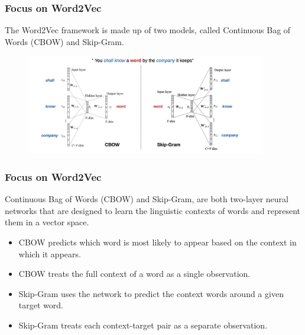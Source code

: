 \documentclass[
    11pt, %
    aspectratio=169, %
]{beamer}
\begin{document}
\begin{frame}
    \frametitle{Focus on Word2Vec}

    The Word2Vec framework is made up of two models, called Continuous Bag of Words (CBOW) and Skip-Gram.

    \begin{figure}
        \centering
        \includegraphics[width=10.5cm]{Images/mod.png}
        \label{fig:my_label}
    \end{figure}
     
\end{frame}

\begin{frame}
    \frametitle{Focus on Word2Vec}

    Continuous Bag of Words (CBOW) and Skip-Gram, are both two-layer neural networks that are designed to learn the linguistic contexts of words and represent them in a vector space.
    \begin{block}{}
        \begin{itemize}
            \item CBOW predicts which word is most likely to appear based on the context in which it appears.
            \item CBOW treats the full context of a word as a single observation.
            \item Skip-Gram uses the network to predict the context words around a given target word.
            \item Skip-Gram treats each context-target pair as a separate observation.
        \end{itemize}
    \end{block}
     
\end{frame}




	
	
\end{document}
